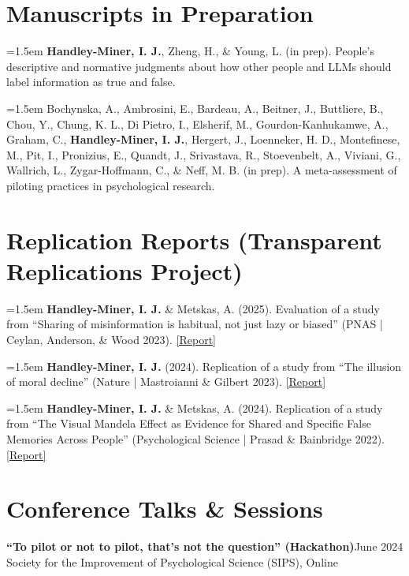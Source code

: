 \documentclass[11pt, letterpaper]{article}
\newcommand{\cventry}[3]{%
    \textbf{#1}\hfill #2\\
    {\color{mutedgray}#3}\par\vspace{0.3em}%
}
\newcommand{\pub}[1]{\par\hangindent=1.5em\hangafter=1 #1\par\vspace{0.4em}}
\begin{document}
\section{Manuscripts in Preparation}

\pub{\textbf{Handley-Miner, I. J.}, Zheng, H., \& Young, L. (in prep). People's descriptive and normative judgments about how other people and LLMs should label information as true and false.}

\pub{Bochynska, A., Ambrosini, E., Bardeau, A., Beitner, J., Buttliere, B., Chou, Y., Chung, K. L., Di Pietro, I., Elsherif, M., Gourdon-Kanhukamwe, A., Graham, C., \textbf{Handley-Miner, I. J.}, Hergert, J., Loenneker, H. D., Montefinese, M., Pit, I., Pronizius, E., Quandt, J., Srivastava, R., Stoevenbelt, A., Viviani, G., Wallrich, L., Zygar-Hoffmann, C., \& Neff, M. B. (in prep). A meta-assessment of piloting practices in psychological research.}

\section{Replication Reports (Transparent Replications Project)}

\pub{\textbf{Handley-Miner, I. J.} \& Metskas, A. (2025). Evaluation of a study from ``Sharing of misinformation is habitual, not just lazy or biased'' (PNAS | Ceylan, Anderson, \& Wood 2023). \href{https://replications.clearerthinking.org/replication-2023pnas120-30/}{[Report]}}

\pub{\textbf{Handley-Miner, I. J.} (2024). Replication of a study from ``The illusion of moral decline'' (Nature | Mastroianni \& Gilbert 2023). \href{https://replications.clearerthinking.org/replication-2023nature618/}{[Report]}}

\pub{\textbf{Handley-Miner, I. J.} \& Metskas, A. (2024). Replication of a study from ``The Visual Mandela Effect as Evidence for Shared and Specific False Memories Across People'' (Psychological Science | Prasad \& Bainbridge 2022). \href{https://replications.clearerthinking.org/replication-2022psci33-12/}{[Report]}}

\section{Conference Talks \& Sessions}

\cventry{``To pilot or not to pilot, that's not the question'' (Hackathon)}{June 2024}
    {Society for the Improvement of Psychological Science (SIPS), Online}
\end{document}
